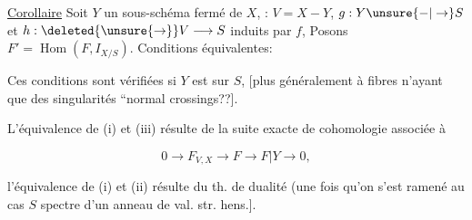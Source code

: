 
\uline{Corollaire} \quad Soit $Y$ un sous-schéma fermé
de $X$,   : $V=X-Y$, $g:Y\unsure{-|\to} S$ et
$h:\deleted{\unsure{\to}} V\longrightarrow S$ induits par $f$, Posons
$F'=\operatorname{Hom}(F,I_{X/S})$. Conditions équivalentes:




Ces conditions sont vérifiées si
$Y$ est   sur $S$, [plus généralement
  à fibres n'ayant que des
singularités ``normal crossings??].

L'équivalence de (i) et (iii)
résulte de la suite exacte de cohomologie
associée à

\[ 0\longrightarrow F_{V,X}\longrightarrow F\longrightarrow F|Y\longrightarrow 0,\]

l'équivalence de (i) et (ii) résulte du
th. de dualité   (une fois
qu'on s'est ramené au cas $S$  spectre
d'un anneau de val.  str. hens.].

